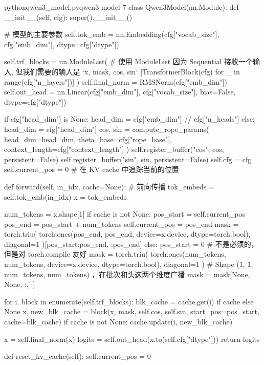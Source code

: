\documentclass[lang=cn,newtx,10pt,scheme=chinese]{elegantbook}
\begin{document}
\begin{codebox}{python}{qwen3\_model.py}{qwen3-model-7}
class Qwen3Model(nn.Module):
    def __init__(self, cfg):
        super().__init__()

        # 模型的主要参数
        self.tok_emb = nn.Embedding(cfg["vocab_size"], cfg["emb_dim"], dtype=cfg["dtype"])

        self.trf_blocks = nn.ModuleList(  # 使用 ModuleList 因为 Sequential 接收一个输入, 但我们需要的输入是 `x, mask, cos, sin`
            [TransformerBlock(cfg) for _ in range(cfg["n_layers"])]
        )
        self.final_norm = RMSNorm(cfg["emb_dim"])
        self.out_head = nn.Linear(cfg["emb_dim"], cfg["vocab_size"], bias=False, dtype=cfg["dtype"])

        if cfg["head_dim"] is None:
            head_dim = cfg["emb_dim"] // cfg["n_heads"]
        else:
            head_dim = cfg["head_dim"]
        cos, sin = compute_rope_params(
            head_dim=head_dim,
            theta_base=cfg["rope_base"],
            context_length=cfg["context_length"]
        )
        self.register_buffer("cos", cos, persistent=False)
        self.register_buffer("sin", sin, persistent=False)
        self.cfg = cfg
        self.current_pos = 0  # 在 KV cache 中追踪当前的位置

    def forward(self, in_idx, cache=None):
        # 前向传播
        tok_embeds = self.tok_emb(in_idx)
        x = tok_embeds

        num_tokens = x.shape[1]
        if cache is not None:
            pos_start = self.current_pos
            pos_end = pos_start + num_tokens
            self.current_pos = pos_end
            mask = torch.triu(
                torch.ones(pos_end, pos_end, device=x.device, dtype=torch.bool), diagonal=1
            )[pos_start:pos_end, :pos_end]
        else:
            pos_start = 0  # 不是必须的，但是对 torch.compile 友好
            mask = torch.triu(
                torch.ones(num_tokens, num_tokens, device=x.device, dtype=torch.bool), diagonal=1
            )
        # Shape (1, 1, num_tokens, num_tokens) ，在批次和头这两个维度广播
        mask = mask[None, None, :, :]

        for i, block in enumerate(self.trf_blocks):
            blk_cache = cache.get(i) if cache else None
            x, new_blk_cache = block(x, mask, self.cos, self.sin,
                                     start_pos=pos_start,
                                     cache=blk_cache)
            if cache is not None:
                cache.update(i, new_blk_cache)

        x = self.final_norm(x)
        logits = self.out_head(x.to(self.cfg["dtype"]))
        return logits

    def reset_kv_cache(self):
        self.current_pos = 0
\end{codebox}
\end{document}
